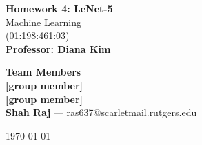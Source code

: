\documentclass[12pt]{article}
\begin{document}
\begin{titlepage}
    \begin{center}
    
        \vspace*{3cm}
        
        {\Huge \textbf{Homework 4: LeNet-5}}\\[1.2cm]
        
        {\Large Machine Learning}\\[0.2cm]
        {\large (01:198:461:03)}\\[1.2cm]
        
        {\Large \textbf{Professor: Diana Kim}}\\[2.5cm]
        
        \vfill
        
        {\Huge \textbf{Team Members}}\\[1.5cm]
        
        {\Large \textbf{[group member]}}\\[0.5cm]
        {\Large \textbf{[group member]}}\\[0.5cm]
        {\Large \textbf{Shah Raj} — ras637@scarletmail.rutgers.edu}\\[1.5cm]
        
        \vfill
        
        {\large \today}
        
    \end{center}
\end{titlepage}

\newpage
\end{document}
